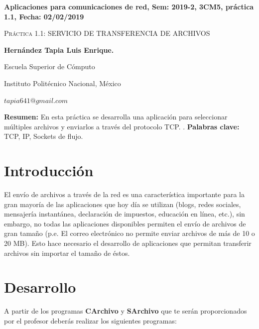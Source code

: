 \documentclass[12pt,twoside]{article}
\date{}
\begin{document}
\centerline{\bf Aplicaciones para comunicaciones de red, Sem: 2019-2, 3CM5, pr\'actica 1.1, Fecha: 02/02/2019}
\centerline{}
\centerline{}
\begin{center}
\Large{\textsc{Pr\'actica 1.1: SERVICIO DE TRANSFERENCIA DE ARCHIVOS}}
\end{center}
\centerline{}
\centerline{\bf {Hern\'andez Tapia Luis Enrique.}}
\centerline{}
\centerline{Escuela Superior de C\'omputo}
\centerline{Instituto Polit\'ecnico Nacional, M\'exico}
\centerline{$tapia641@gmail.com$}
\newtheorem{Theorem}{\quad Theorem}[section]
\newtheorem{Definition}[Theorem]{\quad Definition}
\newtheorem{Corollary}[Theorem]{\quad Corollary}
\newtheorem{Lemma}[Theorem]{\quad Lemma}
\newtheorem{Example}[Theorem]{\quad Example}
\bigskip

\textbf{Resumen:} En esta pr\'actica se desarrolla una aplicaci\'on para seleccionar m\'ultiples archivos y enviarlos a trav\'es del protocolo TCP. \newline.
\textbf{\newline Palabras clave:} TCP, IP, Sockets de flujo.



\section{Introducci\'on}

El env\'io de archivos a trav\'es de la red es una caracter\'istica importante para la gran mayor\'ia de las aplicaciones que hoy d\'ia se utilizan (blogs, redes sociales, mensajer\'ia instant\'anea, declaraci\'on de impuestos, educaci\'on en l\'inea, etc.), sin embargo, no todas las aplicaciones disponibles permiten el env\'io de archivos de gran tama\~no (p.e. El correo electr\'onico no permite enviar archivos de m\'as de 10 o 20 MB).
Esto hace necesario el desarrollo de aplicaciones que permitan transferir archivos sin importar el tama\~no de \'estos.

\newpage


\section{Desarrollo}

A partir de los programas \textbf{CArchivo} y \textbf{SArchivo} que te ser\'an proporcionados por el profesor deber\'as realizar los siguientes programas: \newline\newline 
\end{document}

